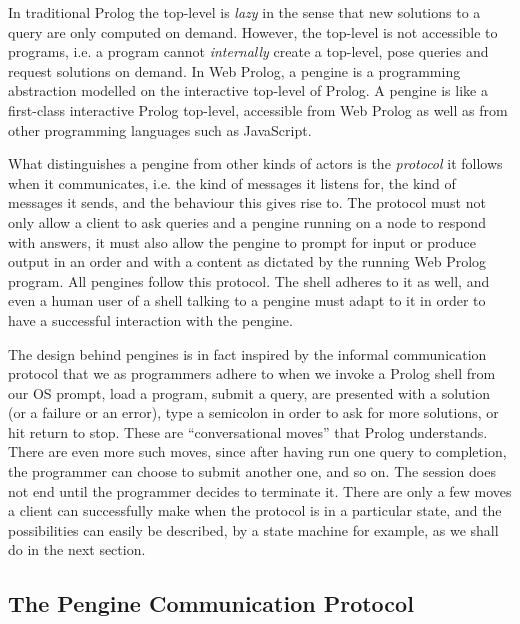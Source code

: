 \documentclass{tlp}
\begin{document}
In traditional Prolog the top-level is \textit{lazy} in the sense that new solutions to a query are only computed on demand. However, the top-level is not accessible to programs, i.e. a program cannot \emph{internally} create a top-level, pose queries and request solutions on demand. In Web Prolog, a pengine is a programming abstraction modelled on the interactive top-level of Prolog. A pengine is like a first-class interactive Prolog top-level, accessible from Web Prolog as well as from other programming languages such as JavaScript. 


What distinguishes a pengine from other kinds of actors is the \textit{protocol} it follows when it communicates, i.e. the kind of messages it listens for, the kind of messages it sends, and the behaviour this gives rise to. The protocol must not only allow a client to ask queries and a pengine running on a node to respond with answers, it must also allow the pengine to prompt for input or produce output in an order and with a content as dictated by the running Web Prolog program. All pengines follow this protocol. The shell adheres to it as well, and even a human user of a shell talking to a pengine must adapt to it in order to have a successful interaction with the pengine.

The design behind pengines is in fact inspired by the informal communication protocol that we as programmers adhere to when we invoke a Prolog shell from our OS prompt, load a program, submit a query, are presented with a solution (or a failure or an error), type a semicolon in order to ask for more solutions, or hit return to stop. These are ``conversational moves'' that Prolog understands. There are even more such moves, since after having run one query to completion, the programmer can choose to submit another one, and so on. The session does not end until the programmer decides to terminate it. There are only a few moves a client can successfully make when the protocol is in a particular state, and the possibilities can easily be described, by a state machine for example, as we shall do in the next section.



\subsection{The Pengine Communication Protocol}\label{sec:pcp}
\end{document}
